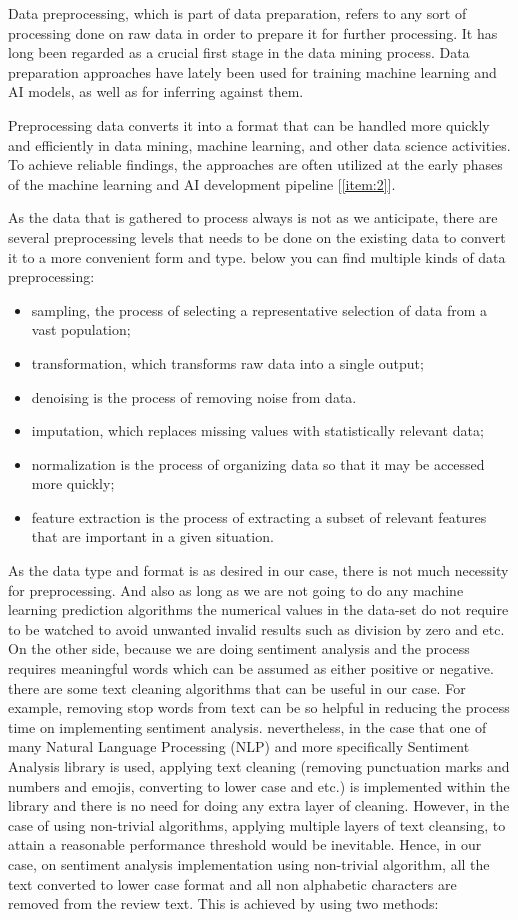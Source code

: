 Data preprocessing, which is part of data preparation, refers to any sort of processing done on raw data in order to prepare it for further processing. It has long been regarded as a crucial first stage in the data mining process. Data preparation approaches have lately been used for training machine learning and AI models, as well as for inferring against them.

Preprocessing data converts it into a format that can be handled more quickly and efficiently in data mining, machine learning, and other data science activities. To achieve reliable findings, the approaches are often utilized at the early phases of the machine learning and AI development pipeline [\ref{item:2}].

As the data that is gathered to process always is not as we anticipate, there are several preprocessing levels that needs to be done on the existing data to convert it to a more convenient form and type. below you can find multiple kinds of data preprocessing:
\begin{itemize}
    \item sampling, the process of selecting a representative selection of data from a vast population;
    \item transformation, which transforms raw data into a single output;
    \item denoising is the process of removing noise from data.
    \item imputation, which replaces missing values with statistically relevant data;
    \item normalization is the process of organizing data so that it may be accessed more quickly;
    \item feature extraction is the process of extracting a subset of relevant features that are important in a given situation.
\end{itemize}

As the data type and format is as desired in our case, there is not much necessity for preprocessing. And also as long as we are not going to do any machine learning prediction algorithms the numerical values in the data-set do not require to be watched to avoid unwanted invalid results such as division by zero and etc. On the other side, because we are doing sentiment analysis and the process requires meaningful words which can be assumed as either positive or negative. there are some text cleaning algorithms that can be useful in our case. For example, removing stop words from text can be so helpful in reducing the process time on implementing sentiment analysis. nevertheless, in the case that one of many Natural Language Processing (NLP) and more specifically Sentiment Analysis library is used, applying text cleaning (removing punctuation marks and numbers and emojis, converting to lower case and etc.) is implemented within the library and there is no need for doing any extra layer of cleaning. However, in the case of using non-trivial algorithms, applying multiple layers of text cleansing, to attain a reasonable performance threshold would be inevitable. Hence, in our case, on sentiment analysis implementation using non-trivial algorithm, all the text converted to lower case format and all non alphabetic characters are removed from the review text. This is achieved by using two methods:
